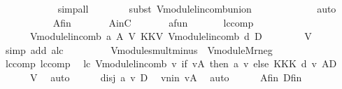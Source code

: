 \begin{isabellebody}
\ \ \ \ \ \ \ \ \ \ \isamarkupfalse%
\ {\isacharparenleft}simp{\isacharunderscore}all{\isacharparenright}\isanewline
\ \ \ \ \ \ \isamarkupfalse%
\ {\isacharparenleft}subst\ V{\isachardot}module{\isachardot}lincomb{\isacharunderscore}union{}{\isacharparenright}\isanewline
\ \ \ \ \ \ \ \ \ \ \ \isamarkupfalse%
\ {\isacharparenleft}auto{\isacharparenright}\isanewline
\ \ \ \ \isamarkupfalse%
\isanewline
\ \ \ \ \ \ A{\isacharprime}fin\ \isanewline
\ \ \ \ \ \ A{\isacharprime}inC\ \isanewline
\ \ \ \ \ \ a{\isacharprime}fun\ \isanewline
\ \ \ \ \isamarkupfalse%
\ lccomp{}{\isacharcolon}\ \isanewline
\ \ \ \ \ \ {\isachardoublequoteopen}V{\isachardot}module{\isachardot}lincomb\ a{\isacharprime}\ A{\isacharprime}\ {\isasymoplus}\isactrlbsub V\isactrlesub \ {\isasymominus}\isactrlbsub K\isactrlesub {\isasymone}\isactrlbsub K\isactrlesub {\isasymodot}\isactrlbsub V\isactrlesub \ V{\isachardot}module{\isachardot}lincomb\ d\ D\ {\isacharequal}\ \isanewline
\ \ \ \ \ \ {\isasymzero}\isactrlbsub V\isactrlesub {\isachardoublequoteclose}\ \isanewline
\ \ \ \ \ \ \isamarkupfalse%
\ {\isacharparenleft}simp\ add{\isacharcolon}\ a{\isacharprime}{\isacharunderscore}lc\ \isanewline
\ \ \ \ \ \ \ \ V{\isachardot}module{\isachardot}smult{\isacharunderscore}minus{\isacharunderscore}{}\ \ V{\isachardot}module{\isachardot}M{\isachardot}r{\isacharunderscore}neg{\isacharparenright}\isanewline
\ \ \ \ \isamarkupfalse%
\ lccomp{}\ lccomp{}\ \isamarkupfalse%
\ lc{}{\isacharcolon}\ {\isachardoublequoteopen}V{\isachardot}module{\isachardot}lincomb\ {\isacharparenleft}{\isasymlambda}v{\isachardot}\ if\ v{\isasymin}A{\isacharprime}\ then\ a{\isacharprime}\ v\ else\ {\isasymominus}\isactrlbsub K\isactrlesub {\isasymone}\isactrlbsub K\isactrlesub {\isasymotimes}\isactrlbsub K\isactrlesub \ d\ v{\isacharparenright}\ {\isacharparenleft}A{\isacharprime}{\isasymunion}D{\isacharparenright}\isanewline
\ \ \ \ \ \ {\isacharequal}{\isasymzero}\isactrlbsub V\isactrlesub {\isachardoublequoteclose}\ \isamarkupfalse%
\ auto\isanewline
\ \ \ \ \isamarkupfalse%
\ disj\ a{\isacharprime}\ v\ D\ \isamarkupfalse%
\ v{\isacharunderscore}nin{\isacharcolon}\ {\isachardoublequoteopen}v{\isasymnotin}A{\isacharprime}{\isachardoublequoteclose}\ \isamarkupfalse%
\ auto\isanewline
\ \ \ \ \isamarkupfalse%
\ A{\isacharprime}fin\ Dfin\ \isanewline

\end{isabellebody}
